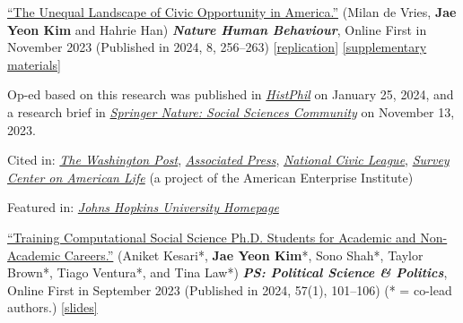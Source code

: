 \documentclass[10pt, letterpaper]{article}
\renewenvironment{itemize}{
\begin{list}{}{
        \setlength{\leftmargin}{1.5em}
        \setlength{\itemsep}{0.10em}
        \setlength{\parskip}{0pt}
        \setlength{\parsep}{0.10em}
    }
}{
\end{list}
}
\begin{document}
\begin{etaremune}
\item \href{https://www.nature.com/articles/s41562-023-01743-1?utm_campaign=related_content&utm_source=SOCIAL&utm_medium=communities}{``The Unequal Landscape of Civic Opportunity in America.''} (Milan de Vries, \textbf{Jae Yeon Kim} and Hahrie Han) \textbf{\textit{Nature Human Behaviour}}, Online First in November 2023 (Published in 2024, 8, 256--263) [\href{https://github.com/snfagora/map_civic_opportunity/tree/main}{replication}] \href{https://static-content.springer.com/esm/art%3A10.1038%2Fs41562-023-01743-1/MediaObjects/41562_2023_1743_MOESM1_ESM.pdf}{[supplementary materials]}
\begin{itemize}
    \item Op-ed based on this research was published in \textit{\href{https://histphil.org/2024/01/25/the-uneven-landscape-of-civic-opportunity-in-the-united-states-what-we-discovered-while-mapping-the-modern-agora/}{HistPhil}} on January 25, 2024, and a research brief in \textit{\href{https://go.nature.com/45qrXpz}{Springer Nature: Social Sciences Community}} on November 13, 2023.
    \item Cited in: \textit{\href{https://www.washingtonpost.com/opinions/2024/10/14/healthy-democracy-ecosystem-map-civic-engagement/}{The Washington Post}}, \textit{\href{https://apnews.com/article/trust-for-civic-life-rural-everyday-democracy-7faa9145d8d2930616280161c245bb64}{Associated Press}}, \textit{\href{https://www.nationalcivicleague.org/ncr-article/the-geography-of-discontent-and-what-democratic-innovations-can-do-about-it/}{National Civic League}}, \textit{\href{https://www.americansurveycenter.org/research/disconnected-places-and-spaces/}{Survey Center on American Life}} (a project of the American Enterprise Institute)
    \item Featured in: \textit{\href{https://hub.jhu.edu/2023/11/13/civic-opportunity-heat-map/}{Johns Hopkins University Homepage}}
\end{itemize}

\item \href{https://www.cambridge.org/core/journals/ps-political-science-and-politics/article/training-computational-social-science-phd-students-for-academic-and-nonacademic-careers/1455690939833B9FFCAC664D4E412057?utm_source=hootsuite&utm_medium=twitter&utm_campaign=PSC_Sep23}{``Training Computational Social Science Ph.D. Students for Academic and Non-Academic Careers.''} (Aniket Kesari*, \textbf{Jae Yeon Kim}*, Sono Shah*, Taylor Brown*, Tiago Ventura*, and Tina Law*) \textbf{\textit{PS: Political Science \& Politics}}, Online First in September 2023 (Published in 2024, 57(1), 101--106) (* = co-lead authors.) \href{https://github.com/jaeyk/jaeyk.github.io/blob/main/slides/training_css_phd.pdf}{[slides]}


\end{etaremune}
\end{document}
